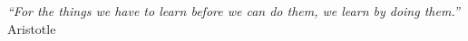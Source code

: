 \cleardoublepage
\thispagestyle{plain}

\vspace*{8cm}

\begin{flushright}
   \textsl{``For the things we have to learn before we can do them, we learn by doing them.''} \\
\vspace*{1.5cm}
    Aristotle
\end{flushright}
